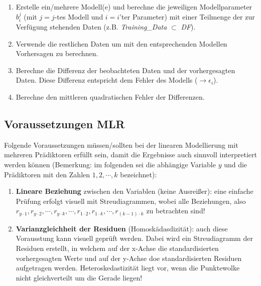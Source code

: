 \documentclass[]{article}
\providecommand{\tightlist}{%
  \setlength{\itemsep}{0pt}\setlength{\parskip}{0pt}}
\begin{document}
\begin{enumerate}
\def\labelenumi{\arabic{enumi}.}
\tightlist
\item
  Erstelle ein/mehrere Modell(e) und berechne die jeweiligen
  Modellparameter \(b_i^j\) (mit \(j = j\)-tes Modell und \(i = i\)'ter
  Parameter) mit einer Teilmenge der zur Verfügung stehenden Daten (z.B.
  \emph{Training\_Data} \(\subset\) \emph{DF}).
\item
  Verwende die restlichen Daten um mit den entsprechenden Modellen
  Vorhersagen zu berechnen.
\item
  Berechne die Differenz der beobachteten Daten und der vorhergesagten
  Daten. Diese Differenz entspricht dem Fehler des Modells
  (\(\rightarrow \epsilon_i\)).
\item
  Berechne den mittleren quadratischen Fehler der Differenzen.
\end{enumerate}

\subsection*{Voraussetzungen MLR}\label{voraussetzungen-mlr}

Folgende Voraussetzungen müssen/sollten bei der linearen Modellierung
mit mehreren Prädiktoren erfüllt sein, damit die Ergebnisse auch
sinnvoll interpretiert werden können (Bemerkung: im folgenden sei die
abhängige Variable \(y\) und die Prädiktoren mit den Zahlen
\({1, 2, \cdots, k}\) bezeichnet):

\begin{enumerate}
\def\labelenumi{\arabic{enumi}.}
\tightlist
\item
  \textbf{Lineare Beziehung} zwischen den Variablen (keine Ausreißer):
  eine einfache Prüfung erfolgt visuell mit Streudiagrammen, wobei alle
  Beziehungen, also
  \(r_{y\cdot1}, r_{y\cdot2}, \cdots, r_{y\cdot k}, \cdots, r_{1\cdot2}, r_{1\cdot k}, \cdots, r_{(k-1)\cdot k}\)
  zu betrachten sind!
\item
  \textbf{Varianzgleichheit der Residuen} (Homoskädasdizität): auch
  diese Vorausstung kann visuell geprüft werden. Dabei wird ein
  Streudiagramm der Residuen erstellt, in welchem auf der x-Achse die
  standardisierten vorhergesagten Werte und auf der y-Achse doe
  standardisierten Residuen aufgetragen werden. Heteroskedastizität
  liegt vor, wenn die Punktewolke nicht gleichverteilt um die Gerade
  liegen!
\end{enumerate}
\end{document}
